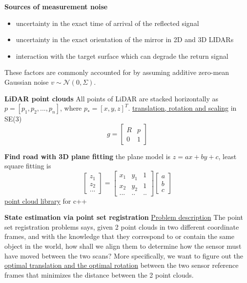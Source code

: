 \textbf{Sources of measurement noise}
\begin{itemize}
    \item uncertainty in the exact time of arrival of the reflected signal
    \item uncertainty in the exact orientation of the mirror in 2D and 3D LIDARs
    \item interaction with the target surface which can degrade the return signal
\end{itemize}
These factors are commonly accounted for by assuming additive zero-mean Gaussian noise $v\sim \mathcal{N}(0, \Sigma)$.

\textbf{LiDAR point clouds}
All points of LiDAR are stacked horizontally as $p = [p_1, p_2, ..., p_n]$, where $p_\ast=[x,y,z]^T$. \underline{translation, rotation and scaling} in SE(3)
\begin{equation}
    g = \left[ \begin{array}{cc}
        R & p \\
        0 & 1
        \end{array} \right]
\end{equation}

\textbf{Find road with 3D plane fitting}
the plane model is $z=ax+by+c$, least square fitting is
\begin{equation}
    \left[ \begin{array}{c}
        z_1 \\
        z_2 \\
        ...
        \end{array} \right] = 
        \left[ \begin{array}{ccc}
            x_1 & y_1 & 1\\
            x_2 & y_2 & 1\\
            ... & ..  & ..
            \end{array} \right] \left[ \begin{array}{c}
                a \\
                b \\
                c
                \end{array} \right]
\end{equation}
\underline{point cloud library} for c++

\textbf{State estimation via point set registration}
\underline{Problem description} The point set registration problems says, given 2 point clouds in two different coordinate frames, and with the knowledge that they correspond to or contain the same object in the world, how shall we align them to determine how the sensor must have moved between the two scans? More specifically, we want to figure out the \underline{optimal translation and the optimal rotation} between the two sensor reference frames that minimizes the distance between the 2 point clouds.

